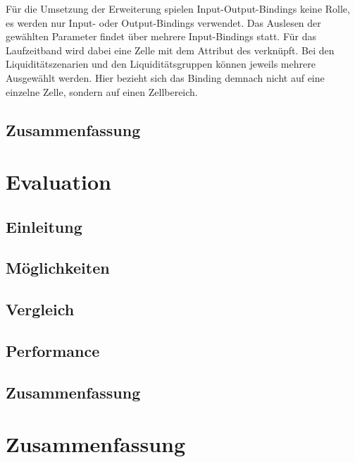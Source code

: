 \begin{onehalfspacing}
Für die Umsetzung der Erweiterung spielen Input-Output-Bindings keine Rolle, es werden nur Input- oder Output-Bindings verwendet. Das Auslesen der gewählten Parameter findet über mehrere Input-Bindings statt. Für das Laufzeitband wird dabei eine Zelle mit dem Attribut  des  verknüpft. Bei den Liquiditätszenarien und den Liquiditätsgruppen können jeweils mehrere Ausgewählt werden. Hier bezieht sich das Binding demnach nicht auf eine einzelne Zelle, sondern auf einen Zellbereich.


\section{Zusammenfassung}

\chapter{Evaluation}

\section{Einleitung}
\section{Möglichkeiten}
\section{Vergleich}
\section{Performance}
\section{Zusammenfassung}

\chapter{Zusammenfassung}


\end{onehalfspacing}


\seAppendix{}

